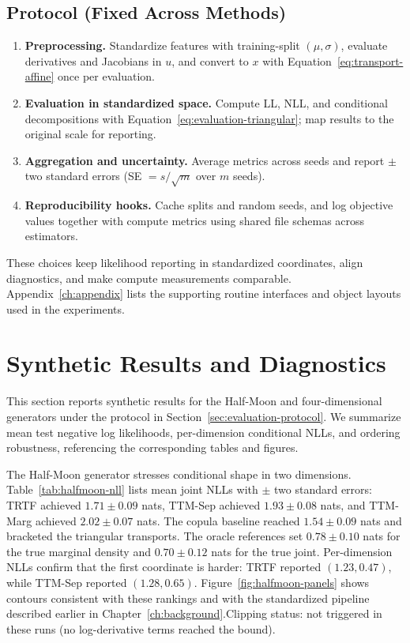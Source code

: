\documentclass[11pt,a4paper,twoside]{book}\usepackage[]{graphicx}\usepackage[]{xcolor}
\begin{document}
\subsection{Protocol (Fixed Across Methods)}

\begin{enumerate}
  \item \textbf{Preprocessing.} Standardize features with training-split $(\mu, \sigma)$, evaluate derivatives and Jacobians in $u$, and convert to $x$ with Equation~\eqref{eq:transport-affine} once per evaluation.
  \item \textbf{Evaluation in standardized space.} Compute LL, NLL, and conditional decompositions with Equation~\eqref{eq:evaluation-triangular}; map results to the original scale for reporting.
  \item \textbf{Aggregation and uncertainty.} Average metrics across seeds and report $\pm$ two standard errors (SE $= s/\sqrt{m}$ over $m$ seeds).
  \item \textbf{Reproducibility hooks.} Cache splits and random seeds, and log objective values together with compute metrics using shared file schemas across estimators.
\end{enumerate}

These choices keep likelihood reporting in standardized coordinates, align diagnostics, and make compute measurements comparable. Appendix~\ref{ch:appendix} lists the supporting routine interfaces and object layouts used in the experiments.
\section{Synthetic Results and Diagnostics}\label{sec:synthetic-results}

This section reports synthetic results for the Half-Moon and four-dimensional generators under the protocol in Section~\ref{sec:evaluation-protocol}. We summarize mean test negative log likelihoods, per-dimension conditional NLLs, and ordering robustness, referencing the corresponding tables and figures.

The Half-Moon generator stresses conditional shape in two dimensions. Table~\ref{tab:halfmoon-nll} lists mean joint NLLs with $\pm$ two standard errors: TRTF achieved $1.71 \pm 0.09$ nats, TTM-Sep achieved $1.93 \pm 0.08$ nats, and TTM-Marg achieved $2.02 \pm 0.07$ nats. The copula baseline reached $1.54 \pm 0.09$ nats and bracketed the triangular transports. The oracle references set $0.78 \pm 0.10$ nats for the true marginal density and $0.70 \pm 0.12$ nats for the true joint. Per-dimension NLLs confirm that the first coordinate is harder: TRTF reported $(1.23, 0.47)$, while TTM-Sep reported $(1.28, 0.65)$. Figure~\ref{fig:halfmoon-panels} shows contours consistent with these rankings and with the standardized pipeline described earlier in Chapter~\ref{ch:background}.\;Clipping status: not triggered in these runs (no log-derivative terms reached the bound).
\end{document}
